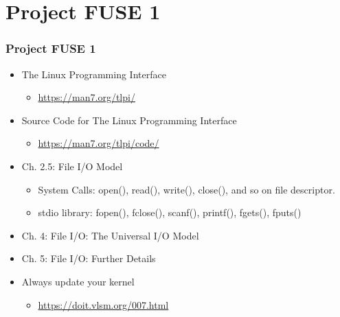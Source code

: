 \documentclass[aspectratio=169, xcolor=table, notheorems, hyperref={pdfpagelabels=false}]{beamer}
\begin{document}
\section{Project FUSE 1}
\begin{frame}[fragile]
\frametitle{Project FUSE 1}
\begin{itemize}
\item The Linux Programming Interface
\begin{itemize}
\item \url{https://man7.org/tlpi/}
\end{itemize}
\item Source Code for The Linux Programming Interface
\begin{itemize}
\item \url{https://man7.org/tlpi/code/}
\end{itemize}
\item Ch. 2.5: File I/O Model
\begin{itemize}
\item System Calls: open(), read(), write(), close(), and so on file descriptor.
\item stdio library: fopen(), fclose(), scanf(), printf(), fgets(), fputs()
\end{itemize}
\item Ch. 4: File I/O: The Universal I/O Model
\item Ch. 5: File I/O: Further Details
\item Always update your kernel 
\begin{itemize}
\item \url{https://doit.vlsm.org/007.html}
\end{itemize}
\end{itemize}
\end{frame}
\end{document}
